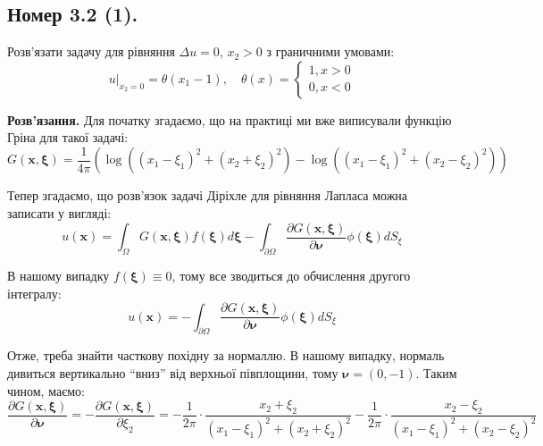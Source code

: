 \documentclass{hw_template}
\begin{document}
\pagebreak

\subsection{Номер 3.2 (1).}

\begin{problem}
    Розв'язати задачу для рівняння $\Delta u = 0$, $x_2 > 0$ з граничними умовами:
    \begin{equation*}
        u\Big|_{x_2=0} = \theta(x_1-1), \quad \theta(x) = \begin{cases}
            1, x > 0 \\
            0, x < 0
        \end{cases}
    \end{equation*}
\end{problem}

\textbf{Розв'язання.} Для початку згадаємо, що на практиці ми вже виписували функцію Гріна для такої задачі:
\begin{equation*}
    G(\mathbf{x}, \boldsymbol{\xi}) = \frac{1}{4\pi}\left(\log\left((x_1-\xi_1)^2 + (x_2+\xi_2)^2\right) - \log((x_1-\xi_1)^2+(x_2-\xi_2)^2)\right)
\end{equation*}

Тепер згадаємо, що розв'язок задачі Діріхле для рівняння Лапласа можна записати у вигляді:
\begin{equation*}
    u(\mathbf{x}) = \int_{\Omega} G(\mathbf{x}, \boldsymbol{\xi})f(\boldsymbol{\xi})d\boldsymbol{\xi} - \int_{\partial\Omega}\frac{\partial G(\mathbf{x}, \boldsymbol{\xi})}{\partial \boldsymbol{\nu}}\phi(\boldsymbol{\xi})dS_{\xi}
\end{equation*}

В нашому випадку $f(\boldsymbol{\xi}) \equiv 0$, тому все зводиться до обчислення другого інтегралу:
\begin{equation*}
    u(\mathbf{x}) = -\int_{\partial\Omega}\frac{\partial G(\mathbf{x}, \boldsymbol{\xi})}{\partial \boldsymbol{\nu}}\phi(\boldsymbol{\xi})dS_{\xi}
\end{equation*}

Отже, треба знайти часткову похідну за нормаллю. В нашому випадку, нормаль дивиться вертикально ``вниз'' від верхньої півплощини, тому $\boldsymbol{\nu} = (0,-1)$. Таким чином, маємо:
\begin{equation*}
    \frac{\partial G(\mathbf{x}, \boldsymbol{\xi})}{\partial \boldsymbol{\nu}} = -\frac{\partial G(\mathbf{x}, \boldsymbol{\xi})}{\partial \xi_2} = -\frac{1}{2\pi} \cdot \frac{x_2+\xi_2}{(x_1-\xi_1)^2+(x_2+\xi_2)^2} - \frac{1}{2\pi} \cdot \frac{x_2-\xi_2}{(x_1-\xi_1)^2+(x_2-\xi_2)^2}
\end{equation*}
\end{document}
